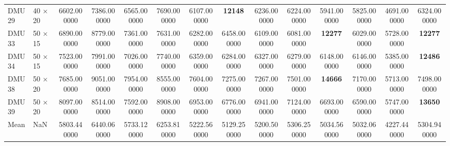 \begin{tabular}{llcccccccccccc}
DMU29 & 40 × 20 & 6602.000000 & 7386.000000 & 6565.000000 & 7690.000000 & 6107.000000 & \textbf{12148} & 6236.000000 & 6224.000000 & 5941.000000 & 5825.000000 & 4691.000000 & 6324.000000 \\
DMU33 & 50 × 15 & 6890.000000 & 8779.000000 & 7361.000000 & 7631.000000 & 6282.000000 & 6458.000000 & 6109.000000 & 6081.000000 & \textbf{12277} & 6029.000000 & 5728.000000 & \textbf{12277} \\
DMU34 & 50 × 15 & 7523.000000 & 7991.000000 & 7026.000000 & 7740.000000 & 6359.000000 & 6284.000000 & 6327.000000 & 6279.000000 & 6148.000000 & 6146.000000 & 5385.000000 & \textbf{12486} \\
DMU38 & 50 × 20 & 7685.000000 & 9051.000000 & 7954.000000 & 8555.000000 & 7604.000000 & 7275.000000 & 7267.000000 & 7501.000000 & \textbf{14666} & 7170.000000 & 5713.000000 & 7498.000000 \\
DMU39 & 50 × 20 & 8097.000000 & 8514.000000 & 7592.000000 & 8908.000000 & 6953.000000 & 6776.000000 & 6941.000000 & 7124.000000 & 6693.000000 & 6590.000000 & 5747.000000 & \textbf{13650} \\
Mean & NaN & 5803.440000 & 6440.060000 & 5733.120000 & 6253.810000 & 5222.560000 & 5129.250000 & 5200.500000 & 5306.250000 & 5034.560000 & 5032.060000 & 4227.440000 & 5304.940000 \\
\bottomrule
\end{tabular}

